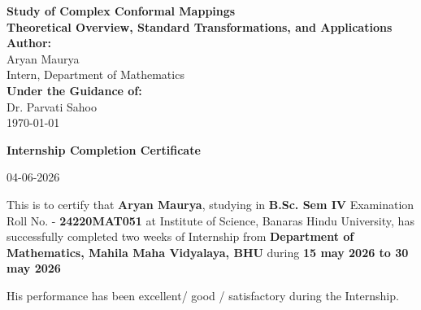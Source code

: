 \documentclass[12pt,a4paper]{article}
\begin{document}

\begin{titlepage}
    \centering
    \vspace*{2cm}
    {\huge\bfseries\color{primaryblue} Study of Complex Conformal Mappings}\\[0.5cm]
    {\large\bfseries Theoretical Overview, Standard Transformations, and Applications}\\[2cm]
    
    {\large\bfseries Author:}\\[0.2cm]
    {\large Aryan Maurya}\\[0.1cm]
    {\small Intern, Department of Mathematics}\\[1.5cm]
    
    {\large\bfseries Under the Guidance of:}\\[0.2cm]
    {\large Dr. Parvati Sahoo}\\[1.5cm]
    
    {\large\today}\\[3cm]
    
    \vfill
\end{titlepage}

\pagestyle{empty}

\begin{center}
    \Huge \textbf{Internship Completion Certificate}
\end{center}

\vspace{1cm}

\begin{flushright}
    \Large 04-06-2026
\end{flushright}

\vspace{1.5cm}

\large
{}
\noindent This is to certify that \textbf{Aryan Maurya}, studying in \textbf{B.Sc. Sem IV} Examination Roll No. - \textbf{24220MAT051} at Institute of Science, Banaras Hindu University, has successfully completed two weeks of Internship from \textbf{Department of Mathematics, Mahila Maha Vidyalaya, BHU} during \textbf{15 may 2026 to 30 may 2026}

\vspace{0.4cm}

\noindent His performance has been excellent/ good / satisfactory during the Internship.
\end{document}
